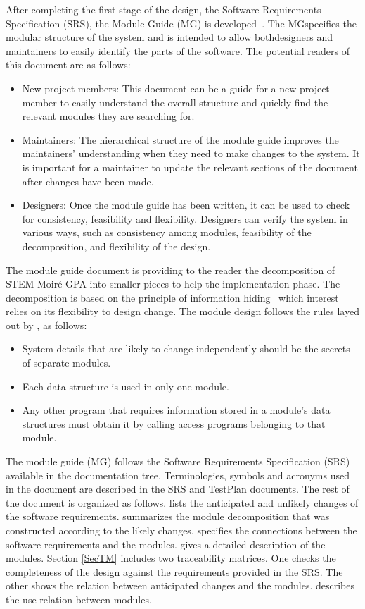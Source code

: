 \documentclass[12pt, titlepage]{article}
\newcommand{\progname}{STEM Moir{\'e} GPA}
\begin{document}
After completing the first stage of the design, the Software Requirements
Specification (SRS), the Module Guide (MG) is developed~\cite{ParnasEtAl1984}. 
The MGspecifies the modular structure of the system and is intended to allow 
bothdesigners and maintainers to easily identify the parts of the software. The
potential readers of this document are as follows:

\begin{itemize}
\item New project members: This document can be a guide for a new project member
  to easily understand the overall structure and quickly find the
  relevant modules they are searching for.
\item Maintainers: The hierarchical structure of the module guide improves the
  maintainers' understanding when they need to make changes to the system. It is
  important for a maintainer to update the relevant sections of the document
  after changes have been made.
\item Designers: Once the module guide has been written, it can be used to
  check for consistency, feasibility and flexibility. Designers can verify the
  system in various ways, such as consistency among modules, feasibility of the
  decomposition, and flexibility of the design.
\end{itemize}
\fi

The module guide document is providing to the reader the decomposition of 
\progname{} into smaller pieces to help the implementation phase. The 
decomposition is based on the principle of information hiding~\cite{Parnas1972a} 
which interest relies on its flexibility to design change. The module design 
follows the rules layed out by \cite{ParnasEtAl1984}, as follows:
\begin{itemize}
\item System details that are likely to change independently should be the
  secrets of separate modules.
\item Each data structure is used in only one module.
\item Any other program that requires information stored in a module's data
  structures must obtain it by calling access programs belonging to that module.
\end{itemize}

The module guide (MG) follows the Software Requirements Specification (SRS) 
available in the documentation tree. Terminologies, symbols and acronyms used in 
the document are described in the SRS and TestPlan documents. The rest of the 
document is organized as follows.  lists the anticipated and 
unlikely changes of the software requirements.  summarizes the 
module decomposition that was constructed according to the likely changes. 
 specifies the connections between the software requirements 
and the modules.  gives a detailed description of the modules. 
Section \cref{SecTM} includes two traceability matrices. One checks the 
completeness of the design against the requirements provided in the SRS. The 
other shows the relation between anticipated changes and the modules. 
 describes the use relation between modules.
\end{document}
